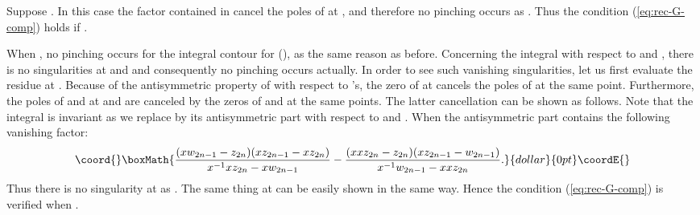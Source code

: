 \documentclass[a4paper,10pt]{article}
\begin{document}
Suppose \coordHE{}. In this case 
the factor \coordHE{} contained in 
\coordHE{} cancel the poles of 
\coordHE{} at \coordHE{}, 
and therefore no pinching occurs as 
\coordHE{}. 
Thus the condition (\ref{eq:rec-G-comp}) holds 
if \coordHE{}. 

When \coordHE{}, no pinching occurs for the 
integral contour for \coordHE{} (\coordHE{}), as the same reason as before. 
Concerning the integral with respect to \coordHE{} 
and \coordHE{}, there is no singularities 
at \coordHE{} and \coordHE{} and 
consequently no pinching occurs actually. 
In order to see such vanishing singularities, 
let us first evaluate the residue at \coordHE{}. 
Because of the antisymmetric property of 
\coordHE{} with respect to \coordHE{}'s, 
the zero of 
\coordHE{} 
at \coordHE{} cancels the poles of 
\coordHE{} at the same point. 
Furthermore, the poles of \coordHE{} 
and \coordHE{} at \coordHE{} 
and \coordHE{} are canceled by 
the zeros of \coordHE{} and 
\coordHE{} 
at the same points. The latter cancellation can be shown 
as follows. 
Note that the integral is invariant as we replace 
\coordHE{} 
by its antisymmetric part with respect to 
\coordHE{} and \coordHE{}. When \coordHE{} 
the antisymmetric part contains the following 
vanishing factor: 
$$\coord{}\boxMath{
\frac{(xw_{2n-1}-z_{2n})(xz_{2n-1}-xz_{2n})}
{x^{-1}xz_{2n}-xw_{2n-1}}-
\frac{(xxz_{2n}-z_{2n})(xz_{2n-1}-w_{2n-1})}
{x^{-1}w_{2n-1}-xxz_{2n}}. 
}{dollar}{0pt}\coordE{}$$
Thus there is no singularity at \coordHE{} as 
\coordHE{}. 
The same thing at \coordHE{} can be easily shown 
in the same way. Hence the condition (\ref{eq:rec-G-comp}) 
is verified when \coordHE{}. 
\end{document}
